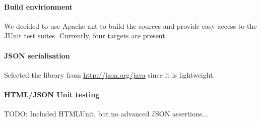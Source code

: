\documentclass[a4paper]{article}
\begin{document}
\paragraph{Build envirionment}
We decided to use Apache ant to build the sources and provide easy access to the JUnit test suites. Currently, four targets are present.

\paragraph{JSON serialisation}
Selected the library from \url{http://json.org/java} since it is lightweight.

\paragraph{HTML/JSON Unit testing}
TODO: Included HTMLUnit, but no advanced JSON assertions...
\end{document}
